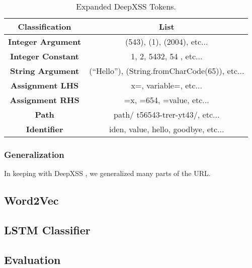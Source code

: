 \begin{table}
\begin{center}
\begin{tabular}{||c | c||} 
    \hline
    Classification & List \\ [0.5ex] 
    \hline\hline
    \textbf{Integer Argument} &  (543), (1), (2004), etc... \\ 
    \hline
    \textbf{Integer Constant} &  1, 2, 5432, 54 , etc... \\ 
    \hline
    \textbf{String Argument} & (``Hello''), (String.fromCharCode(65)), etc... \\
    \hline
    \textbf{Assignment LHS} & x=, variable=, etc... \\
    \hline
    \textbf{Assignment RHS} & =x, =654, =value, etc... \\
    \hline
    \textbf{Path} & path/ t56543-trer-yt43/, etc... \\ 
    \hline
    \textbf{Identifier} & iden, value, hello, goodbye, etc... \\ [1ex] 
    \hline
\end{tabular}
\caption{\label{exp:tok:tab}Expanded DeepXSS Tokens.}
\end{center}
\end{table}

\subsubsection{Generalization}
In keeping with DeepXSS \cite{fang2018deepxss}, we generalized many parts of the URL. 



\subsection{Word2Vec}



\subsection{LSTM Classifier}



\subsection{Evaluation}